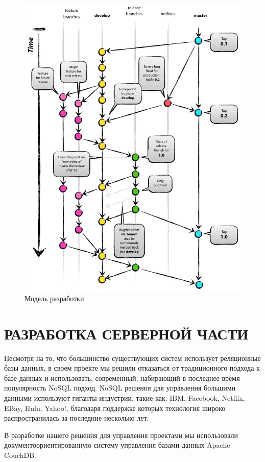 \documentclass[14pt, a4paper]{extreport}
\begin{document}
\begin{figure}[!htb]
  \centering
    \includegraphics[scale=0.3]{../d/pics/branching.png}
    \caption{Модель разработки}
    \label{fig:branching}
\end{figure}


\chapter{\MakeTextUppercase{Разработка серверной части}}
Несмотря на то, что большинство существующих систем использует реляционные
базы данных, в своем проекте мы решили отказаться от традиционного подхода
к базе данных и использовать, современный, набирающий в последнее время популярность
NoSQL подход. NoSQL решения для управления большими данными используют гиганты индустрии,
такие как: IBM, Facebook, Netflix, EBay, Hulu, Yahoo!, благодаря поддержке которых технология
широко распространилась за последние несколько лет.

В разработке нашего решения для управления проектами мы использовали документоориентированную
систему управления базами данных Apache CouchDB.
\end{document}
